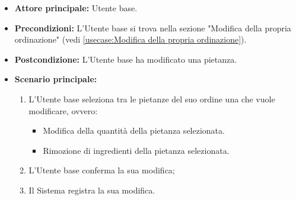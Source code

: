 \label{usecase:Modifica pietanza}
\begin{itemize}
	\item \textbf{Attore principale:} Utente base.

	\item \textbf{Precondizioni:}  L'Utente base si trova nella sezione "Modifica della propria ordinazione" (vedi \autoref{usecase:Modifica della propria ordinazione}).


	\item \textbf{Postcondizione:} L'Utente base ha modificato una pietanza.

	\item \textbf{Scenario principale:}
	      \begin{enumerate}
		      \item L'Utente base seleziona tra le pietanze del suo ordine una che vuole modificare, ovvero:
		            \begin{itemize}
			            \item Modifica della quantità della pietanza selezionata.
			            \item Rimozione di ingredienti della pietanza selezionata.
		            \end{itemize}
		      \item L'Utente base conferma la sua modifica;
		      \item Il Sistema registra la sua modifica.
	      \end{enumerate}
\end{itemize}